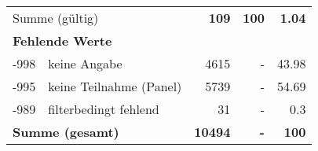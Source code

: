 \begin{longtable}{lXrrr}
     \midrule
     \multicolumn{2}{l}{Summe (gültig)} &
       \textbf{\num{109}} &
     \textbf{100} &
       \textbf{\num[round-mode=places,round-precision=2]{1,04}} \\
     \multicolumn{5}{l}{\textbf{Fehlende Werte}}\\
       -998 &
       keine Angabe &
         \num{4615} &
        - &
         \num[round-mode=places,round-precision=2]{43,98} \\
       -995 &
       keine Teilnahme (Panel) &
         \num{5739} &
        - &
         \num[round-mode=places,round-precision=2]{54,69} \\
       -989 &
       filterbedingt fehlend &
         \num{31} &
        - &
         \num[round-mode=places,round-precision=2]{0,3} \\
     \midrule
     \multicolumn{2}{l}{\textbf{Summe (gesamt)}} &
          \textbf{\num{10494}} &
        \textbf{-} &
        \textbf{100} \\
     \bottomrule
     \end{longtable}
     
